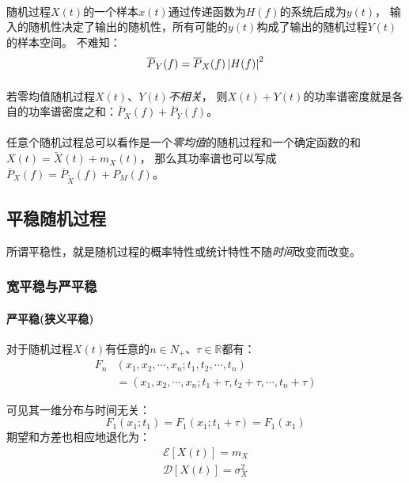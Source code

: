     \paragraph{}随机过程$X(t)$的一个样本$x(t)$通过传递函数为$H(f)$的系统后成为$y(t)$，
    输入的随机性决定了输出的随机性，所有可能的$y(t)$构成了输出的随机过程$Y(t)$的样本空间。
    不难知：
    \begin{equation}
        \overline{P}_Y(f)=\overline{P}_X(f)\left\vert H(f) \right\vert^2
    \end{equation}

    \paragraph{}若零均值随机过程$X(t)$、$Y(t)$\emph{不相关}，
    则$X(t)+Y(t)$的功率谱密度就是各自的功率谱密度之和：$\overline{P}_X(f)+\overline{P}_Y(f)$。

    \paragraph{}任意个随机过程总可以看作是一个\emph{零均值}的随机过程和一个确定函数的和$X(t)=\widetilde{X}(t)+m_X(t)$，
    那么其功率谱也可以写成$\overline{P}_X(f)=\overline{P}_{\widetilde{X}}(f)+P_M(f)$。
    
\subsection{平稳随机过程}
    所谓平稳性，就是随机过程的概率特性或统计特性不随\emph{时间}改变而改变。
    \subsubsection{宽平稳与严平稳}
        \paragraph{严平稳(狭义平稳)}
        对于随机过程$X(t)$有任意的$n\in N_+$、$\tau \in \mathbb{R}$都有：
        \begin{equation}
            \begin{split}
                F_n &(x_1,x_2,\cdots,x_n;t_1,t_2,\cdots,t_n)\\
                    &=(x_1,x_2,\cdots,x_n;t_1+\tau,t_2+\tau,\cdots,t_n+\tau)
            \end{split}
        \end{equation}

        可见其一维分布与时间无关：
        \begin{equation}
            F_1(x_1;t_1)=F_1(x_1;t_1+\tau)=F_1(x_1)
        \end{equation}
        期望和方差也相应地退化为：
        \begin{align}
            \mathscr{E}[X(t)]=m_X\\
            \mathscr{D}[X(t)]=\sigma_X^2
        \end{align}

